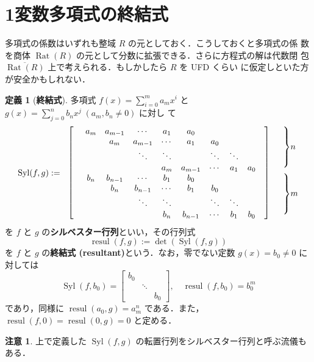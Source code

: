\documentclass[12pt, uplatex, dvipdfmx]{jsarticle}
\newcommand{\ds}{\displaystyle}
\theoremstyle{definition}
\newtheorem*{definition}{定義}
\newtheorem*{remark}{注意}
\DeclareMathOperator{\Syl}{Syl}
\DeclareMathOperator{\resul}{resul}
\DeclareMathOperator{\Rat}{Rat}
\begin{document}
\section{1変数多項式の終結式}

多項式の係数はいずれも整域 $R$ の元としておく．こうしておくと多項式の係
数を商体 $\Rat(R)$ の元として分数に拡張できる．さらに方程式の解は代数閉
包 $\overline{\Rat(R)}$ 上で考えられる．もしかしたら $R$ を UFD くらい
に仮定しといた方が安全かもしれない．


\begin{definition}[\textbf{終結式}]
  多項式 $\ds f(x) = \sum_{i=0}^{m}a_m x^i$ と $\ds g(x) = \sum_{j=0}^{n} b_n x^j \; (a_m, b_n \neq 0)$ に対し
  て
  \[
    \Syl(f,g):=
    \begin{array}{rccccccccll}
      \ldelim[{9}{12pt}[] &  a_m & a_{m-1} & \cdots & a_1 & a_0 & & & & \rdelim]{9}{12pt}[] & \rdelim\}{4}{14pt}[\(n\)]\\
                          &  & a_m & a_{m-1} & \cdots & a_1 & a_0& & & &\\
                          &  & & \ddots & \ddots & & \ddots & \ddots & & & \\
                          &  & & & a_m & a_{m-1} & \cdots & a_1 & a_0 & &\\
                          & b_n & b_{n-1} & \cdots & b_1 & b_0 & & & & &  \rdelim\}{4}{14pt}[\(m\)]\\
                          & & b_n & b_{n-1} & \cdots & b_1 & b_0 & & & & \\
                          & & & \ddots & \ddots & & \ddots & \ddots & & &\\
                          & & & & b_n & b_{n-1} & \cdots & b_1 & b_0 & &
    \end{array}
  \]
  を $f$ と $g$ の\textbf{シルベスター行列}といい，その行列式
  \[
    \resul(f,g):= \det(\Syl(f,g))
  \]
  を $f$ と $g$ の\textbf{終結式 (resultant)}という．なお，零でない定数 $g(x) = b_0 \neq 0$ に対しては
  \[
    \Syl(f, b_0) =\left[
    \begin{array}{ccc}
       b_0  & & \\
            & \ddots & \\
            & & b_0 
    \end{array}
  \right], \quad \resul(f, b_0) = b_0^m
  \]
  であり，同様に $\resul(a_0, g) = a_m^n$ である．また，$\resul(f,0) = \resul(0,g)=0$ と定める．
\end{definition}

\begin{remark}
  上で定義した $\Syl(f,g)$ の転置行列をシルベスター行列と呼ぶ流儀もある．
\end{remark}
\end{document}
